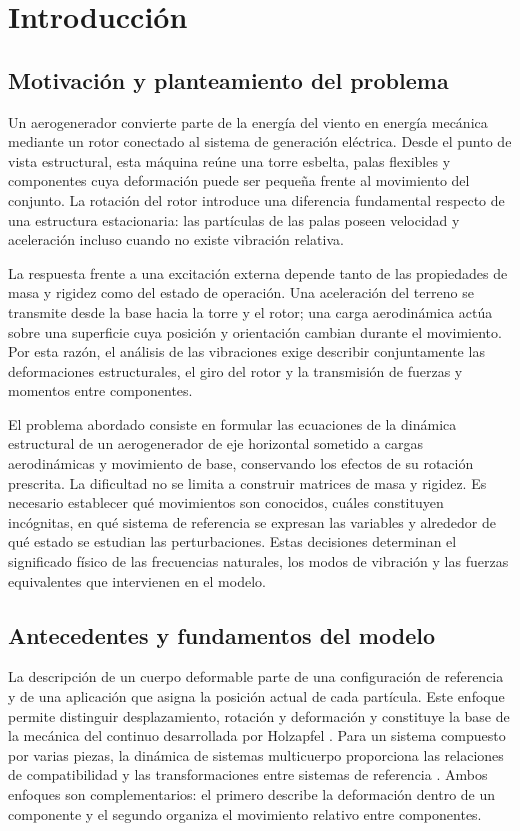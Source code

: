 \chapter{Introducción}
\label{ch:introduccion}
\section{Motivación y planteamiento del problema}
Un aerogenerador convierte parte de la energía del viento en energía mecánica mediante un rotor conectado al sistema de generación eléctrica. Desde el punto de vista estructural, esta máquina reúne una torre esbelta, palas flexibles y componentes cuya deformación puede ser pequeña frente al movimiento del conjunto. La rotación del rotor introduce una diferencia fundamental respecto de una estructura estacionaria: las partículas de las palas poseen velocidad y aceleración incluso cuando no existe vibración relativa.

La respuesta frente a una excitación externa depende tanto de las propiedades de masa y rigidez como del estado de operación. Una aceleración del terreno se transmite desde la base hacia la torre y el rotor; una carga aerodinámica actúa sobre una superficie cuya posición y orientación cambian durante el movimiento. Por esta razón, el análisis de las vibraciones exige describir conjuntamente las deformaciones estructurales, el giro del rotor y la transmisión de fuerzas y momentos entre componentes.

El problema abordado consiste en formular las ecuaciones de la dinámica estructural de un aerogenerador de eje horizontal sometido a cargas aerodinámicas y movimiento de base, conservando los efectos de su rotación prescrita. La dificultad no se limita a construir matrices de masa y rigidez. Es necesario establecer qué movimientos son conocidos, cuáles constituyen incógnitas, en qué sistema de referencia se expresan las variables y alrededor de qué estado se estudian las perturbaciones. Estas decisiones determinan el significado físico de las frecuencias naturales, los modos de vibración y las fuerzas equivalentes que intervienen en el modelo.

\section{Antecedentes y fundamentos del modelo}
La descripción de un cuerpo deformable parte de una configuración de referencia y de una aplicación que asigna la posición actual de cada partícula. Este enfoque permite distinguir desplazamiento, rotación y deformación y constituye la base de la mecánica del continuo desarrollada por Holzapfel \cite{holzapfel}. Para un sistema compuesto por varias piezas, la dinámica de sistemas multicuerpo proporciona las relaciones de compatibilidad y las transformaciones entre sistemas de referencia \cite{shabana}. Ambos enfoques son complementarios: el primero describe la deformación dentro de un componente y el segundo organiza el movimiento relativo entre componentes.

